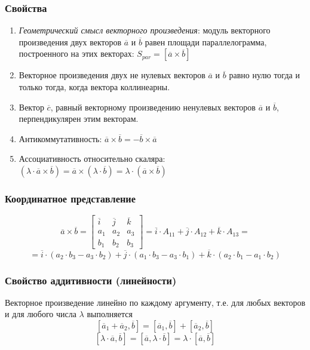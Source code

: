 \documentclass{article}
\begin{document}
\subsubsection{Свойства}
\begin{enumerate}
    \item \textit{Геометрический смысл векторного произведения}: модуль векторного произведения двух векторов $\overline{a}$ и $\overline{b}$ равен площади параллелограмма, построенного на этих векторах: $S_{par} = [\overline{a} \times \overline{b}]$
    \item Векторное произведения двух не нулевых векторов $\overline{a}$ и $\overline{b}$ равно нулю тогда и только  тогда, когда вектора коллинеарны.
    \item Вектор $\overline{c}$, равный векторному произведению ненулевых векторов $\overline{a}$ и $\overline{b}$, перпендикулярен этим векторам.
    \item Антикоммутативность: $\overline{a} \times \overline{b}=-\overline{b}\times\overline{a}$
    \item Ассоциативность относительно скаляра: $(\lambda\cdot\overline{a}\times\overline{b})=\overline{a}\times(\lambda\cdot\overline{b})=\lambda\cdot(\overline{a}\times\overline{b})$ 
    
\end{enumerate}

\subsubsection{Координатное представление}
\[
    \overline{a}\times\overline{b}
    =
    \begin{bmatrix}
    \overline{i} & \overline{j} & \overline{k} \\
    a_1 & a_2 & a_3 \\
    b_1 & b_2 & b_3
    \end{bmatrix}
    = \overline{i}\cdot A_{11}+\overline{j}\cdot A_{12} +\overline{k}\cdot A_{13} =
\]
\[
    =\overline{i}\cdot(a_2\cdot b_3-a_3\cdot b_2)+\overline{j}\cdot(a_1\cdot b_3-a_3\cdot b_1)+\overline{k}\cdot(a_2\cdot b_1-a_1\cdot b_2)
\]
\subsubsection{Свойство аддитивности (линейности)}
 Векторное произведение линейно по каждому аргументу, т.е. для любых векторов и для любого числа $\lambda$ выполняется
 $$ [\overline{a}_1+\overline{a}_2,\overline{b}]=[\overline{a}_1,\overline{b}]+[\overline{a}_2,\overline{b}] $$
 $$ [\lambda\cdot\overline{a},\overline{b}]=[\overline{a},\lambda\cdot\overline{b}]=\lambda\cdot[\overline{a},\overline{b}] $$
 
\end{document}
